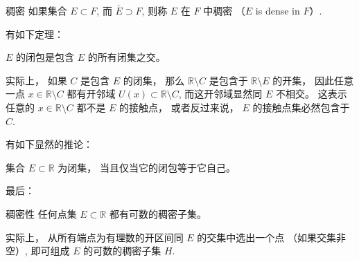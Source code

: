 \begin{definition}{稠密}
如果集合 $E\subset F$, 而 $\bar E\supset F$, 则称 $E$ 在 $F$ 中稠密 （$E$ is dense in $F$）.
\end{definition}

有如下定理：

\begin{theorem}{}
$E$ 的闭包是包含 $E$ 的所有闭集之交。
\end{theorem}
实际上， 如果 $C$ 是包含 $E$ 的闭集， 那么 $\mathbb{R}\setminus C$ 是包含于 $\mathbb{R}\setminus E$ 的开集， 因此任意一点 $x\in\mathbb{R}\setminus C$ 都有开邻域 $U(x)\subset\mathbb{R}\setminus C$, 而这开邻域显然同 $E$ 不相交。 这表示任意的 $x\in\mathbb{R}\setminus C$ 都不是 $E$ 的接触点， 或者反过来说， $E$ 的接触点集必然包含于 $C$. 

有如下显然的推论：
\begin{corollary}{}
集合 $E\subset\mathbb{R}$ 为闭集， 当且仅当它的闭包等于它自己。
\end{corollary}

最后：
\begin{theorem}{稠密性}
任何点集 $E\subset\mathbb{R}$ 都有可数的稠密子集。
\end{theorem}
实际上， 从所有端点为有理数的开区间同 $E$ 的交集中选出一个点 （如果交集非空）, 即可组成 $E$ 的可数的稠密子集 $H$.
